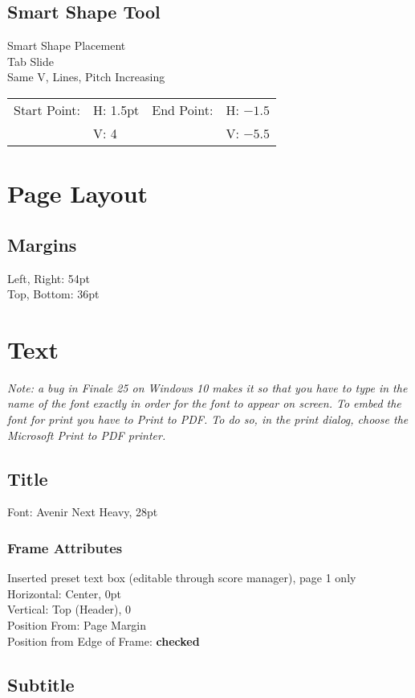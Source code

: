 \documentclass[10pt,twoside]{article} %
\begin{document}
\subsection{Smart Shape Tool}
Smart Shape Placement\\
Tab Slide\\
Same V, Lines, Pitch Increasing\\
\begin{tabular}{l l l l}
Start Point: & H: 1.5pt & End Point: & H: $-1.5$\\
& V: 4 & & V: $-5.5$\\
\end{tabular}
\section{Page Layout}
\subsection{Margins}
Left, Right: 54pt\\
Top, Bottom: 36pt
\section{Text}
\emph{Note: a bug in Finale 25 on Windows 10 makes it so that you have to type in the name of the font exactly in order for the font to appear on screen. To embed the font for print you have to Print to PDF. To do so, in the print dialog, choose the Microsoft Print to PDF printer.}
\subsection{Title}
Font: Avenir Next Heavy, 28pt
\subsubsection{Frame Attributes}
Inserted preset text box (editable through score manager), page 1 only\\
Horizontal: Center, 0pt\\
Vertical: Top (Header), 0\\
Position From: Page Margin\\
Position from Edge of Frame: \textbf{checked}

\subsection{Subtitle}
\label{sec:subtitle}
\end{document}
